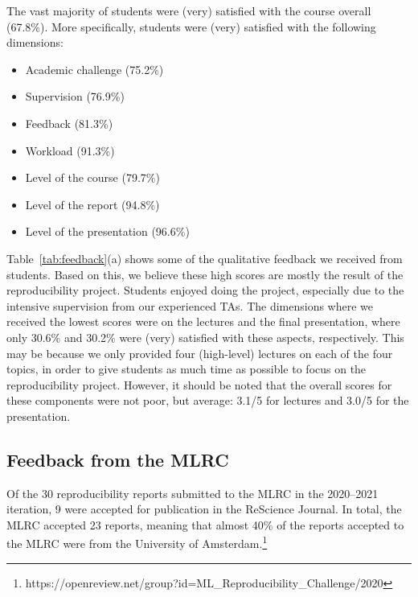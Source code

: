 \documentclass[letterpaper]{article}
\newcommand{\OurUniversity}{the University of Amsterdam}
\begin{document}
The vast majority of students were (very) satisfied with the course overall (67.8\%).
More specifically, students were (very) satisfied with the following dimensions:
\begin{itemize}[leftmargin=*,nosep]
    \item Academic challenge (75.2\%)
    \item Supervision (76.9\%)
    \item Feedback (81.3\%)
    \item Workload (91.3\%)
    \item Level of the course (79.7\%)
    \item Level of the report (94.8\%)
    \item Level of the presentation (96.6\%)
\end{itemize}
Table~\ref{tab:feedback}(a) shows some of the qualitative feedback we received from students.
Based on this, we believe these high scores are mostly the result of the reproducibility project.
Students enjoyed doing the project, especially due to the intensive supervision from our experienced TAs.
The dimensions where we received the lowest scores were on the lectures and the final presentation, where only 30.6\% and 30.2\% were (very) satisfied with these aspects, respectively.
This may be because we only provided four (high-level) lectures on each of the four topics, in order to give students as much time as possible to focus on the reproducibility project.
However, it should be noted that the overall scores for these components were not poor, but average: 3.1/5 for lectures and 3.0/5 for the presentation.

\subsection{Feedback from the MLRC}
\label{section:feedback-mlrc}

Of the 30 reproducibility reports submitted to the MLRC in the 2020--2021 iteration, 9 were accepted for publication in the ReScience Journal.
In total, the MLRC accepted 23 reports, meaning that almost 40\% of the reports accepted to the MLRC were from \OurUniversity{}.\footnote{https://openreview.net/group?id=ML\_Reproducibility\_Challenge/2020}
\end{document}
